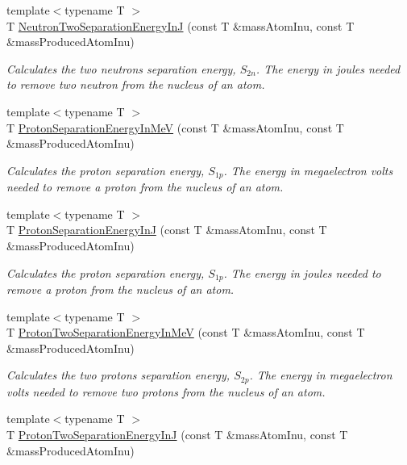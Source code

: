 \begin{DoxyCompactItemize}
{\footnotesize template$<$typename T $>$ }\\T \hyperlink{group___nuclear_separation_energy_ga293ac9428420a0adf4235048dbe529b4}{Neutron\+Two\+Separation\+Energy\+InJ} (const T \&mass\+Atom\+Inu, const T \&mass\+Produced\+Atom\+Inu)
\begin{DoxyCompactList}\small\item\em Calculates the two neutrons separation energy, $S_{2n}$. The energy in joules needed to remove two neutron from the nucleus of an atom. \end{DoxyCompactList}\item 
{\footnotesize template$<$typename T $>$ }\\T \hyperlink{group___nuclear_separation_energy_ga6a619ded55c47ed22ea2d8a85202ebeb}{Proton\+Separation\+Energy\+In\+MeV} (const T \&mass\+Atom\+Inu, const T \&mass\+Produced\+Atom\+Inu)
\begin{DoxyCompactList}\small\item\em Calculates the proton separation energy, $S_{1p}$. The energy in megaelectron volts needed to remove a proton from the nucleus of an atom. \end{DoxyCompactList}\item 
{\footnotesize template$<$typename T $>$ }\\T \hyperlink{group___nuclear_separation_energy_ga4274d8f5a3860169fd81970707eb582a}{Proton\+Separation\+Energy\+InJ} (const T \&mass\+Atom\+Inu, const T \&mass\+Produced\+Atom\+Inu)
\begin{DoxyCompactList}\small\item\em Calculates the proton separation energy, $S_{1p}$. The energy in joules needed to remove a proton from the nucleus of an atom. \end{DoxyCompactList}\item 
{\footnotesize template$<$typename T $>$ }\\T \hyperlink{group___nuclear_separation_energy_ga0de42783a7c650eb32f85dc2d40d84d7}{Proton\+Two\+Separation\+Energy\+In\+MeV} (const T \&mass\+Atom\+Inu, const T \&mass\+Produced\+Atom\+Inu)
\begin{DoxyCompactList}\small\item\em Calculates the two protons separation energy, $S_{2p}$. The energy in megaelectron volts needed to remove two protons from the nucleus of an atom. \end{DoxyCompactList}\item 
{\footnotesize template$<$typename T $>$ }\\T \hyperlink{group___nuclear_separation_energy_gad7c1d4a32daa8aaa53c5fce37c421f82}{Proton\+Two\+Separation\+Energy\+InJ} (const T \&mass\+Atom\+Inu, const T \&mass\+Produced\+Atom\+Inu)

\end{DoxyCompactItemize}
